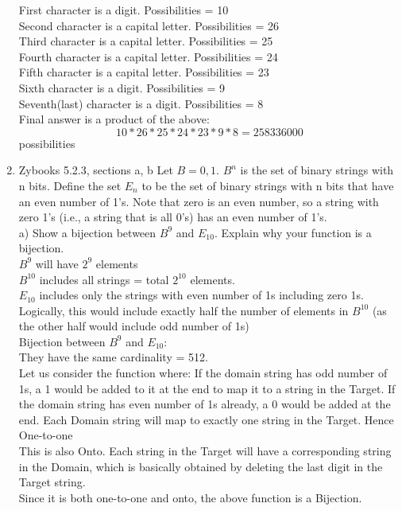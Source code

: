 \documentclass[14pt]{extreport}
\begin{document}
\begin{enumerate}[label=(\alph*)]
First character is a digit. Possibilities = 10\\
Second character is a capital letter. Possibilities = 26\\
Third character is a capital letter. Possibilities = 25\\
Fourth character is a capital letter. Possibilities = 24\\
Fifth character is a capital letter. Possibilities = 23\\
Sixth character is a digit. Possibilities = 9\\
Seventh(last) character is a digit. Possibilities = 8\\

Final answer is a product of the above:\\
\[ 10 * 26 * 25 * 24 * 23 * 9 * 8 = 258336000 \] possibilities
\newline

\item Zybooks 5.2.3, sections a, b
\newline
Let $B = {0, 1}$. $B^{n}$ is the set of binary strings with n bits. Define the set $E_{n}$ to be the set of binary strings with n bits that have an even number of 1's. Note that zero is an even number, so a string with zero 1's (i.e., a string that is all 0's) has an even number of 1's.\\

a) Show a bijection between $B^{9}$ and $E_{10}$. Explain why your function is a bijection.\\

$B^{9}$ will have $2^{9}$ elements\\
$B^{10}$ includes all strings = total $2^{10}$ elements.\\
$E_{10}$ includes only the strings with even number of 1s including zero 1s. Logically, this would include exactly half the number of elements in $B^{10}$ (as the other half would include odd number of 1s)\\

Bijection between $B^{9}$ and $E_{10}$:\\
They have the same cardinality = 512.\\

Let us consider the function where: If the domain string has odd number of 1s, a 1 would be added to it at the end to map it to a string in the Target. If the domain string has even number of 1s already, a 0 would be added at the end. Each Domain string will map to exactly one string in the Target. Hence One-to-one \\
This is also Onto. Each string in the Target will have a corresponding string in the Domain, which is basically obtained by deleting the last digit in the Target string. \\
Since it is both one-to-one and onto, the above function is a Bijection. \\



\end{enumerate}
\end{document}
